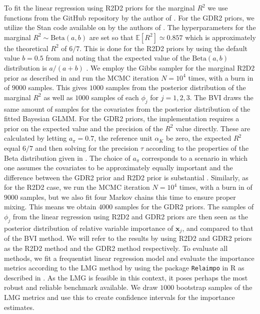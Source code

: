 \noindent To fit the linear regression using R2D2 priors for the marginal $R^2$ we use functions from the GitHub repository \citet{zhang2024r2d2_git} by the author of \citet{zhang2020bayesian}. For the GDR2 priors, we utilize the Stan code available on \citet{aguilar2024GDR_code} by the authors of \citet{aguilar2024generalized}. The hyperparameters for the marginal $R^2 \sim \text{Beta}(a, b)$ are set so that $\mathbb{E}[R^2] \simeq 0.857$ which is approximately the theoretical $R^2$ of $6/7$. This is done for the R2D2 priors by using the default value $b=0.5$ from \citet{zhang2024r2d2_git} and noting that the expected value of the $\text{Beta}(a, b)$ distribution is $a/(a+b)$ \citep{stats_book}. We employ the Gibbs sampler for the marginal R2D2 prior as described in \citep[section 5.3]{zhang2020bayesian} and run the MCMC iteration $N=10^4$ times, with a burn in of $9000$ samples. This gives $1000$ samples from the posterior distribution of the marginal $R^2$ as well as $1000$ samples of each $\phi_j$ for $j=1, 2, 3$. The BVI draws the same amount of samples for the covariates from the posterior distribution of the fitted Bayesian GLMM.
For the GDR2 priors, the implementation requires a prior on the expected value and the precision of the $R^2$ value directly. These are calculated by letting $a_{\pi}=0.7$, the reference unit $\alpha_K$ be zero, the expected $R^2$ equal $6/7$ and then solving for the precision $\tau$ according to the properties of the Beta distribution given in \citet{aguilar2024generalized}. The choice of $a_{\pi}$ corresponds to a scenario in which one assumes the covariates to be approximately equally important and the difference between the GDR2 prior and R2D2 prior is substantial \citep{aguilar2024generalized}. Similarly, as for the R2D2 case, we run the MCMC iteration $N=10^4$ times, with a burn in of $9000$ samples, but we also fit four Markov chains this time to ensure proper mixing. This means we obtain $4000$ samples for the GDR2 priors. The samples of $\phi_j$ from the linear regression using R2D2 and GDR2 priors are then seen as the posterior distribution of relative variable importance of $\mathbf{x}_j$, and compared to that of the BVI method. We will refer to the results by using R2D2 and GDR2 priors as the R2D2 method and the GDR2 method respectively. To evaluate all methods, we fit a frequentist linear regression model and evaluate the importance metrics according to the LMG method by using the package \texttt{Relaimpo} \citep{groemping2023relaimpo} in R as described in \citet{gromping_relaimpo}. As the LMG is feasible in this context, it poses perhaps the most robust and reliable benchmark available. We draw $1000$ bootstrap samples of the LMG metrics and use this to create confidence intervals for the importance estimates. 



